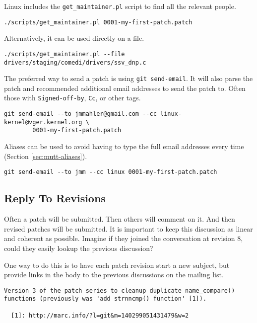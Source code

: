 \documentclass{article}
\begin{document}
Linux includes the \verb+get_maintainer.pl+ script to find all the relevant
people.

\begin{verbatim}
./scripts/get_maintainer.pl 0001-my-first-patch.patch
\end{verbatim}

Alternatively, it can be used directly on a file.

\begin{verbatim}
./scripts/get_maintainer.pl --file drivers/staging/comedi/drivers/ssv_dnp.c
\end{verbatim}

The preferred way to send a patch is using \verb+git send-email+.
It will also parse the patch and recommended additional email addresses
to send the patch to.  Often those with \verb+Signed-off-by+, \verb+Cc+, or other tags.

\begin{verbatim}
git send-email --to jmmahler@gmail.com --cc linux-kernel@vger.kernel.org \
        0001-my-first-patch.patch
\end{verbatim}

Aliases can be used to avoid having to type the full email addresses
every time (Section \ref{sec:mutt-aliases}).

\begin{verbatim}
git send-email --to jmm --cc linux 0001-my-first-patch.patch
\end{verbatim}

\subsection{Reply To Revisions}

Often a patch will be submitted.  Then others will comment on it.
And then revised patches will be submitted.  It is important to keep
this discussion as linear and coherent as possible.  Imagine if they
joined the conversation at revision 8, could they easily lookup the
previous discussion?

One way to do this is to have each patch revision start a new subject,
but provide links in the body to the previous discussions on the mailing list.

\begin{verbatim}
Version 3 of the patch series to cleanup duplicate name_compare()
functions (previously was 'add strnncmp() function' [1]).  
    
  [1]: http://marc.info/?l=git&m=140299051431479&w=2
\end{verbatim}
\end{document}
